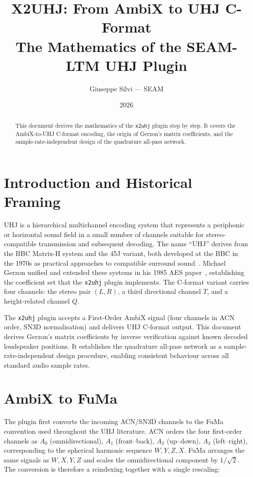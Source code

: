 \documentclass[11pt,a4paper]{article}
\title{X2UHJ: From AmbiX to UHJ C-Format\\\large The Mathematics of the SEAM-LTM UHJ Plugin}
\author{Giuseppe Silvi --- SEAM}
\date{2026}
\begin{document}
\maketitle
\begin{abstract}
This document derives the mathematics of the \texttt{x2uhj} plugin step by step.
It covers the AmbiX-to-UHJ C-format encoding, the origin of Gerzon's matrix coefficients, and the sample-rate-independent design of the quadrature all-pass network.
\end{abstract}
\tableofcontents

\section{Introduction and Historical Framing}

UHJ is a hierarchical multichannel encoding system that represents a periphonic or horizontal sound field in a small number of channels suitable for stereo-compatible transmission and subsequent decoding.
The name ``UHJ'' derives from the BBC Matrix-H system and the 45J variant, both developed at the BBC in the 1970s as practical approaches to compatible surround sound~\cite{gerzon1977uhj}.
Michael Gerzon unified and extended these systems in his 1985 AES paper~\cite{gerzon1983broadcast}, establishing the coefficient set that the \texttt{x2uhj} plugin implements.
The C-format variant carries four channels: the stereo pair $(L, R)$, a third directional channel $T$, and a height-related channel $Q$.

The \texttt{x2uhj} plugin accepts a First-Order AmbiX signal (four channels in ACN order, SN3D normalisation) and delivers UHJ C-format output.
This document derives Gerzon's matrix coefficients by inverse verification against known decoded loudspeaker positions.
It establishes the quadrature all-pass network as a sample-rate-independent design procedure, enabling consistent behaviour across all standard audio sample rates.

\section{AmbiX to FuMa}

The plugin first converts the incoming ACN/SN3D channels to the FuMa convention used throughout the UHJ literature.
ACN orders the four first-order channels as $A_0$ (omnidirectional), $A_1$ (front--back), $A_2$ (up--down), $A_3$ (left--right), corresponding to the spherical harmonic sequence $W, Y, Z, X$.
FuMa arranges the same signals as $W, X, Y, Z$ and scales the omnidirectional component by $1/\sqrt{2}$.
The conversion is therefore a reindexing together with a single rescaling:
\end{document}

